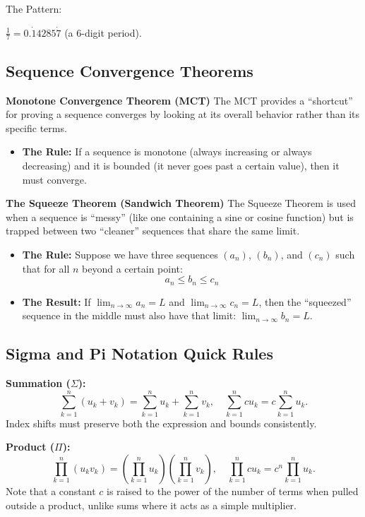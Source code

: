 The Pattern:

$\frac{1}{7} = 0.\dot{1}4285\dot{7}$ (a 6-digit period).

\subsection{Sequence Convergence Theorems}

\textbf{Monotone Convergence Theorem (MCT)}
The MCT provides a ``shortcut'' for proving a sequence converges by looking at its overall behavior rather than its specific terms.
\begin{itemize}[leftmargin=*]
\item \textbf{The Rule:} If a sequence is monotone (always increasing or always decreasing) and it is bounded (it never goes past a certain value), then it must converge.
\end{itemize}

\textbf{The Squeeze Theorem (Sandwich Theorem)}
The Squeeze Theorem is used when a sequence is ``messy'' (like one containing a sine or cosine function) but is trapped between two ``cleaner'' sequences that share the same limit.
\begin{itemize}[leftmargin=*]
\item \textbf{The Rule:} Suppose we have three sequences $(a_n)$, $(b_n)$, and $(c_n)$ such that for all $n$ beyond a certain point:
\[
a_n \le b_n \le c_n
\]
\item \textbf{The Result:} If $\lim_{n \to \infty} a_n = L$ and $\lim_{n \to \infty} c_n = L$, then the ``squeezed'' sequence in the middle must also have that limit: $\lim_{n \to \infty} b_n = L$.
\end{itemize}

\subsection{Sigma and Pi Notation Quick Rules}

\textbf{Summation ($\Sigma$):}
\[
\sum_{k=1}^{n}(u_k+v_k)=\sum_{k=1}^{n}u_k+\sum_{k=1}^{n}v_k,
\quad
\sum_{k=1}^{n}cu_k = c\sum_{k=1}^{n}u_k.
\]
Index shifts must preserve both the expression and bounds consistently.

\textbf{Product ($\Pi$):}
\[
\prod_{k=1}^{n}(u_k v_k)=\left(\prod_{k=1}^{n}u_k\right)\left(\prod_{k=1}^{n}v_k\right),
\quad
\prod_{k=1}^{n}cu_k = c^n\prod_{k=1}^{n}u_k.
\]
Note that a constant $c$ is raised to the power of the number of terms when pulled outside a product, unlike sums where it acts as a simple multiplier.

